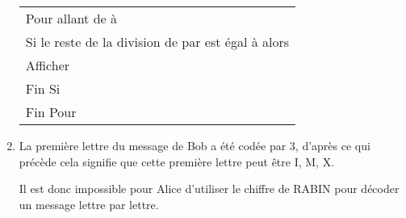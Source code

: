 \documentclass[11pt,a4paper,answers,fancyhdr]{exam}
\newcommand{\surj}[1]{\fcolorbox{yellow}{yellow}{#1}}
\begin{document}
\begin{enumerate}
\begin{solution}
\begin{center}
\begin{tabularx}{0.7\linewidth}{|X|}\hline
Pour \surj{$x$} allant de \surj{$0$} à \surj{$32$}\\
\quad Si le reste de la division de \surj{$x(x+13$)} par \surj{$33$} est égal à \surj{$3$} alors\\
\qquad Afficher \surj{$x$}\\
\quad Fin Si\\
Fin Pour\\ \hline
\end{tabularx}
\end{center}
\end{solution}

\item %
	

\begin{solution}
La première lettre du message de Bob a été codée par 3, d'après ce qui précède cela signifie que cette première lettre peut être I, M, X.

Il est donc impossible pour Alice d'utiliser le \og chiffre de RABIN \fg{} pour décoder un message lettre par lettre.
\end{solution}
\end{enumerate}
\end{document}
